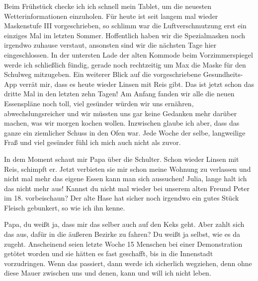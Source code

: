 \documentclass[twoside, a4paper, DIV=11, open=any, bibliography=totoc]{scrbook}
\newcommand{\Quote}[1]{\glqq #1\grqq{}}
\begin{document}
Beim Frühstück checke ich ich schnell mein Tablet, um die neuesten Wetterinformationen
einzuholen. Für heute ist seit langem mal wieder Maskenstufe III vorgeschrieben, 
so schlimm war die Luftverschmutzung erst ein einziges Mal im letzten Sommer.
Hoffentlich haben wir die Spezialmasken noch irgendwo zuhause verstaut,
ansonsten sind wir die nächsten Tage hier eingeschlossen. In der untersten Lade
der alten Kommode beim Vorzimmerspiegel werde ich schließlich fündig, gerade noch
rechtzeitig um Max die Maske für den Schulweg mitzugeben.
Ein weiterer Blick auf die vorgeschriebene Gesundheits-App verrät mir, dass
es heute wieder Linsen mit Reis gibt. Das ist jetzt schon das dritte Mal in den
letzten zehn Tagen! Am Anfang fanden wir alle die neuen Essenspläne noch toll,
viel gesünder würden wir uns ernähren, abwechslungsreicher und wir müssten uns
gar keine Gedanken mehr darüber machen, was wir morgen kochen wollen.
Inzwischen glaube ich aber, dass das ganze ein ziemlicher Schuss in den Ofen war.
Jede Woche der selbe, langweilige Fraß und viel gesünder 
fühl ich mich auch nicht als zuvor.

In dem Moment schaut mir Papa über die Schulter.
\Quote{Schon wieder Linsen mit Reis}, schimpft er. 
\Quote{Jetzt verbieten sie mir schon meine
Wohnung zu verlassen und nicht mal mehr das eigene Essen kann man sich aussuchen!
Julia, lange halt ich das nicht mehr aus! Kannst du nicht mal wieder bei unserem
alten Freund Peter im 18. vorbeischaun? Der alte Hase hat sicher noch irgendwo ein
gutes Stück Fleisch gebunkert, so wie ich ihn kenne.}

Papa, du weißt ja, dass mir das selber auch auf den Keks geht. Aber zahlt sich
das aus, dafür in die äußeren Bezirke zu fahren? Du weißt ja selbst, wie es
da zugeht. Anscheinend seien letzte Woche 15 Menschen bei einer
Demonstration getötet worden und sie hätten es fast geschafft, bis in die
Innenstadt vorzudringen. Wenn das passiert, 
dann werde ich sicherlich wegziehen, denn ohne diese Mauer zwischen uns
und denen, kann und will ich nicht leben. 
\end{document}
